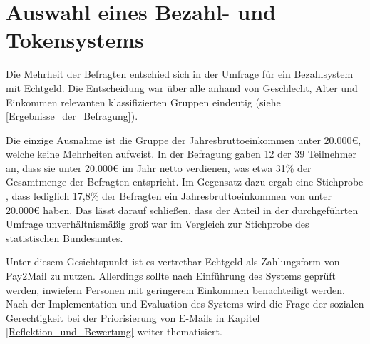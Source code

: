 \section{Auswahl eines Bezahl- und Tokensystems}
\label{Auswahl_eines_Bezahl-_und_Tokensystems}
Die Mehrheit der Befragten entschied sich in der Umfrage für ein Bezahlsystem mit Echtgeld. Die Entscheidung war über alle anhand von Geschlecht, Alter und Einkommen relevanten klassifizierten Gruppen eindeutig (siehe \ref{Ergebnisse_der_Befragung}). 

Die einzige Ausnahme ist die Gruppe der Jahresbruttoeinkommen unter 20.000€, welche keine Mehrheiten aufweist. In der Befragung gaben 12 der 39 Teilnehmer an, dass sie unter 20.000€ im Jahr netto verdienen, was etwa 31\% der Gesamtmenge der Befragten entspricht. Im Gegensatz dazu ergab eine Stichprobe \citep[S. 25 f.]{StatistischesBundesamt2018}, dass lediglich 17,8\% der Befragten ein Jahresbruttoeinkommen von unter 20.000€ haben. Das lässt darauf schließen, dass der Anteil in der durchgeführten Umfrage unverhältnismäßig groß war im Vergleich zur Stichprobe des statistischen Bundesamtes.

Unter diesem Gesichtspunkt ist es vertretbar Echtgeld als Zahlungsform von Pay2Mail zu nutzen. Allerdings sollte nach Einführung des Systems geprüft werden, inwiefern Personen mit geringerem Einkommen benachteiligt werden. Nach der Implementation und Evaluation des Systems wird die Frage der sozialen Gerechtigkeit bei der Priorisierung von E-Mails in Kapitel \ref{Reflektion_und_Bewertung} weiter thematisiert. 
